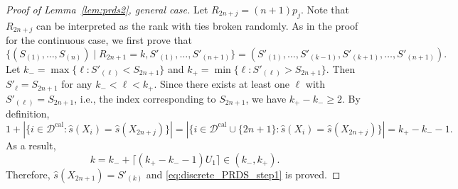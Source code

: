 \documentclass[11pt]{article}
\begin{document}
\begin{proof}[Proof of Lemma~\ref{lem:prds2}, general case]
Let $R_{2n+j} = (n + 1)p_j$. Note that $R_{2n+j}$ can be interpreted as the rank with ties broken randomly. As in the proof for the continuous case, we first prove that
\begin{equation}\label{eq:discrete_PRDS_step1}
\bigg\{(S_{(1)}, \ldots, S_{(n)})\mid R_{2n+1} = k, S'_{(1)}, \ldots, S'_{(n+1)}\bigg\} = (S'_{(1)}, \ldots, S'_{(k-1)}, S'_{(k+1)}, \ldots, S'_{(n+1)}).
\end{equation}
Let $k_{-} = \max\{\ell: S'_{(\ell)} < S_{2n+1}\}$ and $k_{+} = \min\{\ell: S'_{(\ell)} > S_{2n+1}\}$. Then $S'_{\ell} = S_{2n+1}$ for any $k_{-} < \ell < k_{+}$. Since there exists at least one $\ell$ with $S'_{(\ell)} = S_{2n+1}$, i.e., the index corresponding to $S_{2n+1}$, we have $k_{+} - k_{-}\ge 2$. By definition, 
\[1 + |\{i \in \mathcal{D}^{\text{cal}} : \hat{s}(X_i) = \hat{s}(X_{2n+j})\}| = |\{i \in \mathcal{D}^{\text{cal}}\cup \{2n+1\} : \hat{s}(X_i) = \hat{s}(X_{2n+j})\}| = k_{+} - k_{-} - 1.\]
As a result,
\[k = k_{-} + \lceil (k_{+} - k_{-} - 1)U_{1}\rceil\in (k_{-}, k_{+}).\]
Therefore, $\hat{s}(X_{2n+1}) = S'_{(k)}$ and \eqref{eq:discrete_PRDS_step1} is proved.


\end{proof}
\end{document}
